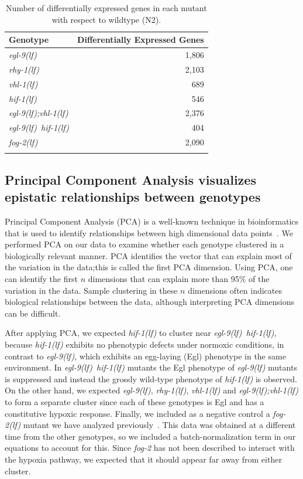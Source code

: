 \documentclass[10pt, onecolumn]{article}
\newcommand{\gene}[1]{\emph{#1}}
\newcommand{\fog}{\emph{\mbox{fog-2(lf)}}}
\newcommand{\egl}{\emph{\mbox{egl-9}(lf)}}
\newcommand{\rhy}{\emph{\mbox{rhy-1}(lf)}}
\newcommand{\vhl}{\emph{\mbox{vhl-1}(lf)}}
\newcommand{\eglvhl}{\emph{\mbox{egl-9(lf);vhl-1(lf)}}}
\newcommand{\eglhif}{\emph{\mbox{egl-9(lf)}~\mbox{hif-1(lf)}}}
\newcommand{\hif}{\emph{\mbox{hif-1(lf)}}}
\newcommand{\egln}{1,806}
\newcommand{\rhyn}{2,103}
\newcommand{\vhln}{689}
\newcommand{\eglvhln}{2,376}
\newcommand{\hifn}{546}
\newcommand{\eglhifn}{404}
\newcommand{\fogn}{2,090}
\begin{document}
\begin{table}[tbhp]
  \centering
  \begin{tabular}{lr}
    \toprule{}
    Genotype & Differentially Expressed Genes\\
    \midrule{}\egl{} & \egln{}\\
    \rhy{} & \rhyn{}\\
    \vhl{} & \vhln{}\\
    \hif{} & \hifn{}\\
    \eglvhl{} & \eglvhln{}\\
    \eglhif{} & \eglhifn{}\\
    \fog{} & \fogn{}\\
    \bottomrule{}
  \end{tabular}
  \caption{Number of differentially expressed genes in each mutant with respect
  to wildtype (N2).}
\label{tab:genes}
\end{table}

\subsection*{Principal Component Analysis visualizes epistatic relationships between genotypes}
\label{sub:Clustering}

Principal Component Analysis (PCA) is a well-known technique in bioinformatics that is
used to identify relationships between high dimensional data points~\cite{Yeung2001}.
We performed PCA on our data to examine whether each genotype clustered in a biologically
relevant manner. PCA identifies the vector that can explain most of the variation
in the data;this is called the first PCA dimension. Using PCA, one can identify
the first $n$ dimensions that can explain more than 95\% of the variation in the
data. Sample clustering in these $n$ dimensions often indicates biological
relationships between the data, although interpreting PCA dimensions can be
difficult.

After applying PCA, we expected \hif{} to cluster near \eglhif{}, because
\hif{} exhibits no phenotypic defects under normoxic conditions, in contrast to
\egl{}, which exhibits an egg-laying (Egl) phenotype in the same environment.
In \eglhif{} mutants the Egl phenotype of \egl{} mutants is suppressed and instead
the grossly wild-type phenotype of \hif{} is observed. On the other hand, we
expected \egl{}, \rhy{}, \vhl{} and \eglvhl{} to form a separate cluster since
each of these genotypes is Egl and has a constitutive hypoxic response. Finally,
we included as a negative control a \fog{} mutant we have analyzed
previously~\cite{Angeles-Albores2016a}. This data was obtained at a different
time from the other genotypes, so we included a batch-normalization term in our
equations to account for this. Since \gene{fog-2} has not been described
to interact with the hypoxia pathway, we expected that it should appear far away
from either cluster.
\end{document}
